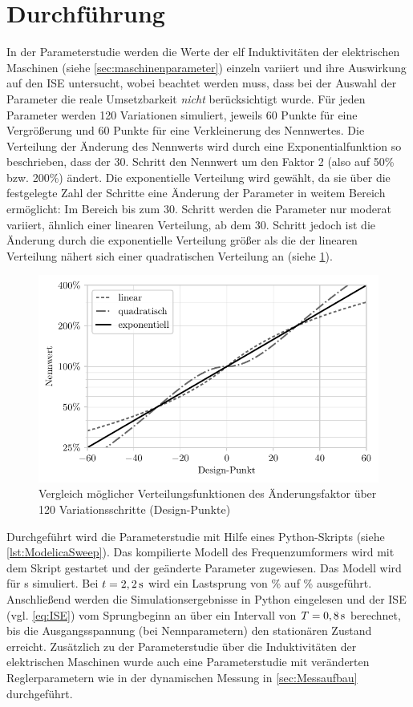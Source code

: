 \section{Durchführung}
In der Parameterstudie werden die Werte der elf Induktivitäten der elektrischen Maschinen (siehe \cref{sec:maschinenparameter}) einzeln variiert und ihre Auswirkung auf den ISE untersucht, wobei beachtet werden muss, dass bei der Auswahl der Parameter die reale Umsetzbarkeit \emph{nicht} berücksichtigt wurde. Für jeden Parameter werden 120 Variationen simuliert, jeweils 60 Punkte für eine Vergrößerung und 60 Punkte für eine Verkleinerung des Nennwertes. Die Verteilung der Änderung des Nennwerts wird durch eine Exponentialfunktion so beschrieben, dass der 30. Schritt den Nennwert um den Faktor 2 (also auf 50\% bzw. 200\%) ändert. Die exponentielle Verteilung wird gewählt, da sie über die festgelegte Zahl der Schritte eine Änderung der Parameter in weitem Bereich ermöglicht: Im Bereich bis zum 30. Schritt werden die Parameter nur moderat variiert, ähnlich einer linearen Verteilung, ab dem 30. Schritt jedoch ist die Änderung durch die exponentielle Verteilung größer als die der linearen Verteilung nähert sich einer quadratischen Verteilung an (siehe \cref{fig:VerteilungParameter}).
\begin{figure}
    \centering
    \includegraphics[width=.8\textwidth]{Bilder/verteilung_log.pdf}
    \caption{Vergleich möglicher Verteilungsfunktionen des Änderungsfaktor über 120 Variationsschritte (Design-Punkte)}
    \label{fig:VerteilungParameter}
\end{figure}

Durchgeführt wird die Parameterstudie mit Hilfe eines Python-Skripts (siehe \cref{lst:ModelicaSweep}). Das kompilierte Modell des Frequenzumformers wird mit dem Skript gestartet und der geänderte Parameter zugewiesen. Das Modell wird für \unit[3]{s} simuliert. Bei $t=\unit[2,2]{s}$ wird ein Lastsprung von \unit[50]{\%} auf \unit[100]{\%} ausgeführt. Anschließend werden die Simulationsergebnisse in Python eingelesen und der ISE (vgl. \cref{eq:ISE}) vom Sprungbeginn an  über ein Intervall von $T=\unit[0,8]{s}$ berechnet, bis die Ausgangsspannung (bei Nennparametern) den stationären Zustand erreicht. Zusätzlich zu der Parameterstudie über die Induktivitäten der elektrischen Maschinen wurde auch eine Parameterstudie mit veränderten Reglerparametern wie in der dynamischen Messung in \cref{sec:Messaufbau} durchgeführt.

